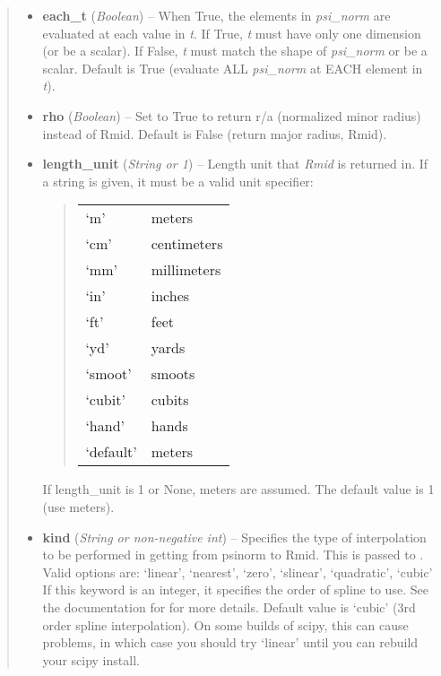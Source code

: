 \documentclass[letterpaper,10pt,english]{sphinxmanual}
\begin{document}
\begin{fulllineitems}
\begin{fulllineitems}
\begin{quote}
\begin{description}
\begin{itemize}
\item {} 
\textbf{each\_t} (\emph{Boolean}) --
When True, the elements in \emph{psi\_norm} are evaluated at
each value in \emph{t}. If True, \emph{t} must have only one dimension (or
be a scalar). If False, \emph{t} must match the shape of \emph{psi\_norm} or be
a scalar. Default is True (evaluate ALL \emph{psi\_norm} at EACH element in
\emph{t}).

\item {} 
\textbf{rho} (\emph{Boolean}) --
Set to True to return r/a (normalized minor radius)
instead of Rmid. Default is False (return major radius, Rmid).

\item {} 
\textbf{length\_unit} (\emph{String or 1}) --
Length unit that \emph{Rmid} is returned in.
If a string is given, it must be a valid unit specifier:
\begin{quote}

\begin{tabulary}{\linewidth}{|L|L|}
\hline

`m'
 & 
meters
\\

`cm'
 & 
centimeters
\\

`mm'
 & 
millimeters
\\

`in'
 & 
inches
\\

`ft'
 & 
feet
\\

`yd'
 & 
yards
\\

`smoot'
 & 
smoots
\\

`cubit'
 & 
cubits
\\

`hand'
 & 
hands
\\

`default'
 & 
meters
\\
\hline\end{tabulary}

\end{quote}

If length\_unit is 1 or None, meters are assumed. The default
value is 1 (use meters).

\item {} 
\textbf{kind} (\emph{String or non-negative int}) --
Specifies the type of
interpolation to be performed in getting from psinorm to
Rmid. This is passed to
. Valid options are:
`linear', `nearest', `zero', `slinear', `quadratic', `cubic'
If this keyword is an integer, it specifies the order of spline
to use. See the documentation for  for more
details. Default value is `cubic' (3rd order spline
interpolation). On some builds of scipy, this can cause problems,
in which case you should try `linear' until you can rebuild your
scipy install.


\end{itemize}
\end{description}
\end{quote}
\end{fulllineitems}
\end{fulllineitems}
\end{document}

